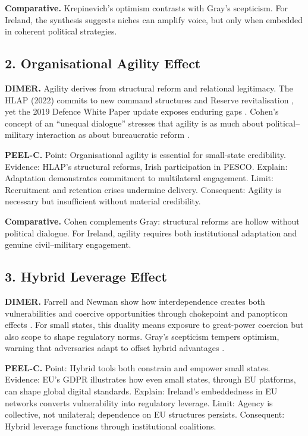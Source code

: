 \textbf{Comparative.} Krepinevich’s optimism contrasts with Gray’s scepticism. For Ireland, the synthesis suggests niches can amplify voice, but only when embedded in coherent political strategies.

\subsection*{2. Organisational Agility Effect}
\textbf{DIMER.} Agility derives from structural reform and relational legitimacy. The HLAP (2022) commits to new command structures and Reserve revitalisation \parencite{HLAP_2022}, yet the 2019 Defence White Paper update exposes enduring gaps \parencite{WHITE_2019}. Cohen’s concept of an ``unequal dialogue'' stresses that agility is as much about political–military interaction as about bureaucratic reform \parencite{COHEN_2002}. 

\textbf{PEEL-C.} Point: Organisational agility is essential for small-state credibility. Evidence: HLAP’s structural reforms, Irish participation in PESCO. Explain: Adaptation demonstrates commitment to multilateral engagement. Limit: Recruitment and retention crises undermine delivery. Consequent: Agility is necessary but insufficient without material credibility. 

\textbf{Comparative.} Cohen complements Gray: structural reforms are hollow without political dialogue. For Ireland, agility requires both institutional adaptation and genuine civil–military engagement.

\subsection*{3. Hybrid Leverage Effect}
\textbf{DIMER.} Farrell and Newman show how interdependence creates both vulnerabilities and coercive opportunities through chokepoint and panopticon effects \parencite{FARRELL_2019}. For small states, this duality means exposure to great-power coercion but also scope to shape regulatory norms. Gray’s scepticism tempers optimism, warning that adversaries adapt to offset hybrid advantages \parencite{GRAY_2005}.

\textbf{PEEL-C.} Point: Hybrid tools both constrain and empower small states. Evidence: EU’s GDPR illustrates how even small states, through EU platforms, can shape global digital standards. Explain: Ireland’s embeddedness in EU networks converts vulnerability into regulatory leverage. Limit: Agency is collective, not unilateral; dependence on EU structures persists. Consequent: Hybrid leverage functions through institutional coalitions. 

